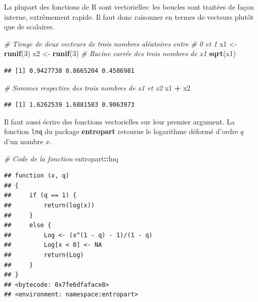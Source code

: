 \documentclass[
  12pt,
  french,
  a4paper,
  extrafontsizes,onecolumn,openright
  ]{memoir}
\newenvironment{Shaded}{\begin{snugshade}}{\end{snugshade}}
\newcommand{\CommentTok}[1]{\textcolor[rgb]{0.56,0.35,0.01}{\textit{#1}}}
\newcommand{\DecValTok}[1]{\textcolor[rgb]{0.00,0.00,0.81}{#1}}
\newcommand{\KeywordTok}[1]{\textcolor[rgb]{0.13,0.29,0.53}{\textbf{#1}}}
\newcommand{\NormalTok}[1]{#1}
\newcommand{\OperatorTok}[1]{\textcolor[rgb]{0.81,0.36,0.00}{\textbf{#1}}}
\newcommand{\StringTok}[1]{\textcolor[rgb]{0.31,0.60,0.02}{#1}}
\begin{document}
La plupart des fonctions de R sont vectorielles: les boucles sont traitées de façon interne, extrêmement rapide.
Il faut donc raisonner en termes de vecteurs plutôt que de scalaires.

\scriptsize

\begin{Shaded}
\begin{Highlighting}[]
\CommentTok{# Tirage de deux vecteurs de trois nombres aléatoires entre}
\CommentTok{# 0 et 1}
\NormalTok{x1 <-}\StringTok{ }\KeywordTok{runif}\NormalTok{(}\DecValTok{3}\NormalTok{)}
\NormalTok{x2 <-}\StringTok{ }\KeywordTok{runif}\NormalTok{(}\DecValTok{3}\NormalTok{)}
\CommentTok{# Racine carrée des trois nombres de x1}
\KeywordTok{sqrt}\NormalTok{(x1)}
\end{Highlighting}
\end{Shaded}

\begin{verbatim}
## [1] 0.9427738 0.8665204 0.4586981
\end{verbatim}

\begin{Shaded}
\begin{Highlighting}[]
\CommentTok{# Sommes respective des trois nombres de x1 et x2}
\NormalTok{x1 }\OperatorTok{+}\StringTok{ }\NormalTok{x2}
\end{Highlighting}
\end{Shaded}

\begin{verbatim}
## [1] 1.6262539 1.6881583 0.9063973
\end{verbatim}

\normalsize

Il faut aussi écrire des fonctions vectorielles sur leur premier argument.
La fonction \texttt{lnq} du package \textbf{entropart} retourne le logarithme déformé d'ordre \(q\) d'un nombre \(x\).

\scriptsize

\begin{Shaded}
\begin{Highlighting}[]
\CommentTok{# Code de la fonction}
\NormalTok{entropart}\OperatorTok{::}\NormalTok{lnq}
\end{Highlighting}
\end{Shaded}

\begin{verbatim}
## function (x, q) 
## {
##     if (q == 1) {
##         return(log(x))
##     }
##     else {
##         Log <- (x^(1 - q) - 1)/(1 - q)
##         Log[x < 0] <- NA
##         return(Log)
##     }
## }
## <bytecode: 0x7fe6dfaface8>
## <environment: namespace:entropart>
\end{verbatim}
\end{document}
